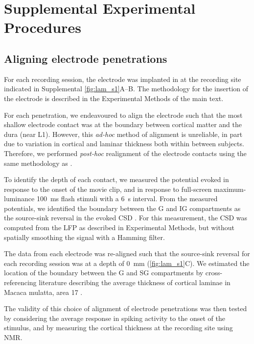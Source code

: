 \FloatBarrier

\section{Supplemental Experimental Procedures}

\subsection{Aligning electrode penetrations}

For each recording session, the electrode was implanted in  at the recording site indicated in Supplemental \autoref{fig:lam_s1}A--B.
The methodology for the insertion of the electrode is described in the Experimental Methods of the main text.

For each penetration, we endeavoured to align the electrode such that the most shallow electrode contact was at the boundary between cortical matter and the dura (near \ac{L1}).
However, this \textit{ad-hoc} method of alignment is unreliable, in part due to variation in cortical and laminar thickness both within between subjects.
Therefore, we performed \textit{post-hoc} realignment of the electrode contacts using the same methodology as \citet{Self2013,VanKerkoerle2014}.

To identify the depth of each contact, we measured the potential evoked in response to the onset of the movie clip, and in response to full-screen maximum-luminance \SI{100}{\milli\second} flash stimuli with a \SI{6}{\second} interval.
From the measured potentials, we identified the boundary between the \ac{G} and \ac{IG} compartments as the source-sink reversal in the evoked \ac{CSD} \citep{Mitzdorf1979,Mitzdorf1985}.
For this measurement, the \ac{CSD} was computed from the \ac{LFP} as described in Experimental Methods, but without spatially smoothing the signal with a Hamming filter.

The data from each electrode was re-aligned such that the source-sink reversal for each recording session was at a depth of \SI{0}{\milli\metre} (\autoref{fig:lam_s1}C).
We estimated the location of the boundary between the \ac{G} and \ac{SG} compartments by cross-referencing literature describing the average thickness of cortical laminae in Macaca mulatta, area 17 \citep{Lund1973,OKusky1982}.

The validity of this choice of alignment of electrode penetrations was then tested by considering the average response in spiking activity to the onset of the stimulus, and by measuring the cortical thickness at the recording site using \ac{NMR}.

